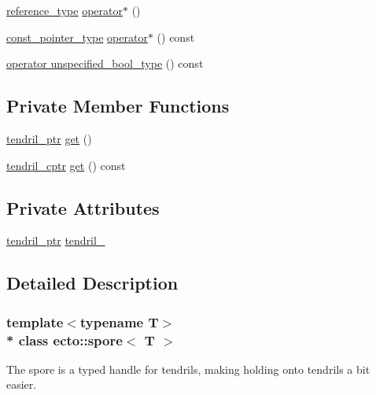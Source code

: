 \begin{DoxyCompactItemize}
\item 
\hyperlink{structecto_1_1spore_a79afa6b324736afc257bc89c6c770f81}{reference\+\_\+type} \hyperlink{structecto_1_1spore_a6d693f3096c3fede0c85351d36adaded}{operator$\ast$} ()
\item 
\hyperlink{structecto_1_1spore_af1219cc7b5343824699fc7f66a5c5891}{const\+\_\+pointer\+\_\+type} \hyperlink{structecto_1_1spore_ae13ad63a891e8ed71d9010c18b754588}{operator$\ast$} () const 
\item 
\hyperlink{structecto_1_1spore_ae47aff3850e59591aed5fe2ad0b8d567}{operator unspecified\+\_\+bool\+\_\+type} () const 
\end{DoxyCompactItemize}
\subsection*{Private Member Functions}
\begin{DoxyCompactItemize}
\item 
\hyperlink{namespaceecto_a84fb5f6130275382e5cbeb5fdececa78}{tendril\+\_\+ptr} \hyperlink{structecto_1_1spore_a42f435f8c44fea74854382e0526e36ca}{get} ()
\item 
\hyperlink{namespaceecto_ad01f26ee47597f71a6f86ee34bb3ffe4}{tendril\+\_\+cptr} \hyperlink{structecto_1_1spore_a07c4091d4e5c14c30de319ec0f14b7de}{get} () const 
\end{DoxyCompactItemize}
\subsection*{Private Attributes}
\begin{DoxyCompactItemize}
\item 
\hyperlink{namespaceecto_a84fb5f6130275382e5cbeb5fdececa78}{tendril\+\_\+ptr} \hyperlink{structecto_1_1spore_a17e2ffe6861f828cad58904d20f117d4}{tendril\+\_\+}
\end{DoxyCompactItemize}


\subsection{Detailed Description}
\subsubsection*{template$<$typename T$>$\\*
class ecto\+::spore$<$ T $>$}

The spore is a typed handle for tendrils, making holding onto tendrils a bit easier. 

